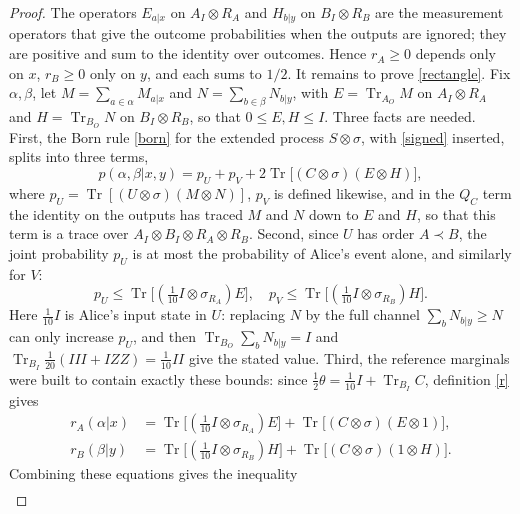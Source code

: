 \documentclass[aps,prl,reprint,superscriptaddress,nofootinbib,longbibliography,raggedbottom]{revtex4-2}
\DeclareMathOperator{\Tr}{Tr}
\begin{document}
\begin{proof}
The operators $E_{a|x}$ on $A_I\otimes R_A$ and $H_{b|y}$ on
$B_I\otimes R_B$ are the measurement operators that give the outcome
probabilities when the outputs are ignored; they are positive and sum to
the identity over outcomes. Hence $r_A\geq0$ depends only on $x$,
$r_B\geq0$ only on $y$, and each sums to $1/2$. It remains to prove
\eqref{rectangle}. Fix $\alpha,\beta$, let
$M=\sum_{a\in\alpha}M_{a|x}$ and $N=\sum_{b\in\beta}N_{b|y}$, with
$E=\Tr_{A_O}M$ on $A_I\otimes R_A$ and $H=\Tr_{B_O}N$ on $B_I\otimes R_B$,
so that $0\leq E,H\leq I$. Three facts are needed. First, the Born rule
\eqref{born} for the extended process $S\otimes\sigma$, with
\eqref{signed} inserted, splits into three terms,
\begin{equation}\label{bornext}
p(\alpha,\beta|x,y)=p_U+p_V+2\Tr\bigl[(C\otimes\sigma)(E\otimes H)\bigr],
\end{equation}
where $p_U=\Tr[(U\otimes\sigma)(M\otimes N)]$, $p_V$ is defined likewise,
and in the $Q_C$ term the identity on the outputs has traced $M$ and $N$
down to $E$ and $H$, so that this term is a trace over
$A_I\otimes B_I\otimes R_A\otimes R_B$. Second, since $U$ has order
$A\prec B$, the joint probability $p_U$ is at most the probability of
Alice's event alone, and similarly for $V$:
\begin{equation}\label{pU}
p_U\leq\Tr\bigl[(\tfrac1{10}I\otimes\sigma_{R_A})E\bigr],\quad
p_V\leq\Tr\bigl[(\tfrac1{10}I\otimes\sigma_{R_B})H\bigr].
\end{equation}
Here $\tfrac1{10}I$ is Alice's input state in $U$: replacing $N$ by the
full channel $\sum_bN_{b|y}\geq N$ can only increase $p_U$, and then
$\Tr_{B_O}\sum_bN_{b|y}=I$ and $\Tr_{B_I}\tfrac1{20}(III+IZZ)=\tfrac1{10}II$
give the stated value. Third, the reference marginals were built to
contain exactly these bounds: since
$\tfrac12\theta=\tfrac1{10}I+\Tr_{B_I}C$, definition \eqref{r} gives
\begin{equation}\label{rsplit}
\begin{split}
r_A(\alpha|x)&=\Tr\bigl[(\tfrac1{10}I\otimes\sigma_{R_A})E\bigr]
 +\Tr\bigl[(C\otimes\sigma)(E\otimes1)\bigr],\\
r_B(\beta|y)&=\Tr\bigl[(\tfrac1{10}I\otimes\sigma_{R_B})H\bigr]
 +\Tr\bigl[(C\otimes\sigma)(1\otimes H)\bigr].
\end{split}
\end{equation}
Combining these equations gives the inequality
\begin{equation}\label{slack}
\begin{split}

\end{split}
\end{equation}
\end{proof}
\end{document}
